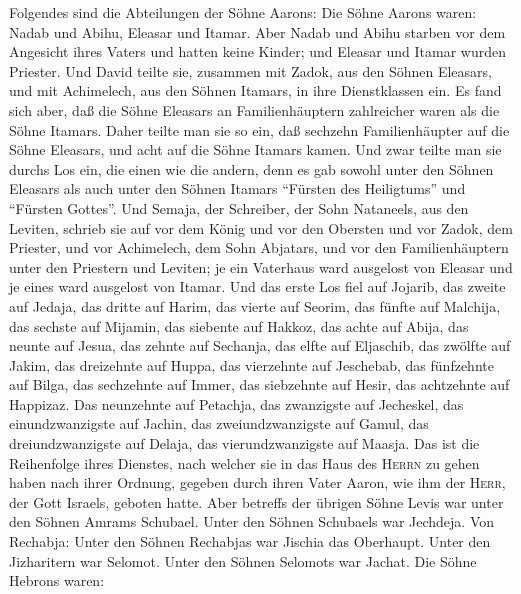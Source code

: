  Folgendes sind die Abteilungen der Söhne Aarons: Die
Söhne Aarons waren: Nadab und Abihu, Eleasar und Itamar. 
Aber Nadab und Abihu starben vor dem Angesicht ihres Vaters und hatten
keine Kinder; und Eleasar und Itamar wurden Priester.  Und
David teilte sie, zusammen mit Zadok, aus den Söhnen Eleasars, und mit
Achimelech, aus den Söhnen Itamars, in ihre Dienstklassen ein.
 Es fand sich aber, daß die Söhne Eleasars an
Familienhäuptern zahlreicher waren als die Söhne Itamars. Daher teilte
man sie so ein, daß sechzehn Familienhäupter auf die Söhne Eleasars, und
acht auf die Söhne Itamars kamen.  Und zwar teilte man sie
durchs Los ein, die einen wie die andern, denn es gab sowohl unter den
Söhnen Eleasars als auch unter den Söhnen Itamars ``Fürsten des
Heiligtums'' und ``Fürsten Gottes''.  Und Semaja, der
Schreiber, der Sohn Nataneels, aus den Leviten, schrieb sie auf vor dem
König und vor den Obersten und vor Zadok, dem Priester, und vor
Achimelech, dem Sohn Abjatars, und vor den Familienhäuptern unter den
Priestern und Leviten; je ein Vaterhaus ward ausgelost von Eleasar und
je eines ward ausgelost von Itamar.  Und das erste Los
fiel auf Jojarib, das zweite auf Jedaja,  das dritte auf
Harim, das vierte auf Seorim,  das fünfte auf Malchija,
das sechste auf Mijamin,  das siebente auf Hakkoz, das
achte auf Abija,  das neunte auf Jesua, das zehnte auf
Sechanja,  das elfte auf Eljaschib, das zwölfte auf
Jakim,  das dreizehnte auf Huppa, das vierzehnte auf
Jeschebab,  das fünfzehnte auf Bilga, das sechzehnte auf
Immer,  das siebzehnte auf Hesir, das achtzehnte auf
Happizaz.  Das neunzehnte auf Petachja, das zwanzigste
auf Jecheskel,  das einundzwanzigste auf Jachin, das
zweiundzwanzigste auf Gamul,  das dreiundzwanzigste auf
Delaja, das vierundzwanzigste auf Maasja.  Das ist die
Reihenfolge ihres Dienstes, nach welcher sie in das Haus des
\textsc{Herrn} zu gehen haben nach ihrer Ordnung, gegeben durch ihren
Vater Aaron, wie ihm der \textsc{Herr}, der Gott Israels, geboten hatte.
 Aber betreffs der übrigen Söhne Levis war unter den
Söhnen Amrams Schubael. Unter den Söhnen Schubaels war Jechdeja.
 Von Rechabja: Unter den Söhnen Rechabjas war Jischia das
Oberhaupt.  Unter den Jizharitern war Selomot. Unter den
Söhnen Selomots war Jachat.  Die Söhne Hebrons waren:
